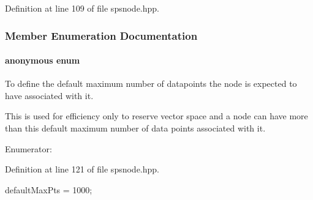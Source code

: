 \-Definition at line 109 of file spsnode.\-hpp.



\subsubsection{\-Member \-Enumeration \-Documentation}
\hypertarget{classsubpavings_1_1SPSnode_a208ab19f2444e75f9602f8fd136fc03d}{\paragraph[{anonymous enum}]{\setlength{\rightskip}{0pt plus 5cm}anonymous enum}}\label{classsubpavings_1_1SPSnode_a208ab19f2444e75f9602f8fd136fc03d}


\-To define the default maximum number of datapoints the node is expected to have associated with it. 

\-This is used for efficiency only to reserve vector space and a node can have more than this default maximum number of data points associated with it. \begin{Desc}
\item[\-Enumerator\-: ]\par
\begin{description}
\item[{\em 
\hypertarget{classsubpavings_1_1SPSnode_a208ab19f2444e75f9602f8fd136fc03da54168a18fc82748182314929de5e3367}{default\-Max\-Pts}\label{classsubpavings_1_1SPSnode_a208ab19f2444e75f9602f8fd136fc03da54168a18fc82748182314929de5e3367}
}]\end{description}
\end{Desc}



\-Definition at line 121 of file spsnode.\-hpp.


\begin{DoxyCode}
{defaultMaxPts = 1000};
\end{DoxyCode}


